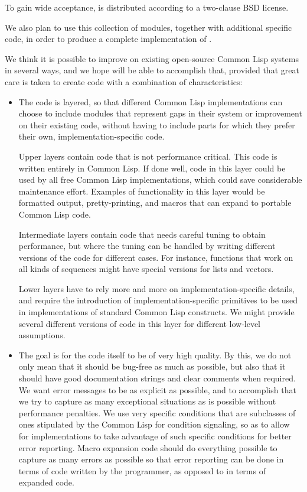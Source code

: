 To gain wide acceptance, \sysname{} is distributed according to a
two-clause BSD license.

We also plan to use this collection of modules, together with
additional specific code, in order to produce a complete
implementation of \commonlisp{}.

We think it is possible to improve on existing open-source Common Lisp
systems in several ways, and we hope \sysname{} will be able to
accomplish that, provided that great care is taken to create code with
a combination of characteristics:

\begin{itemize}
\item The code is layered, so that different Common Lisp
  implementations can choose to include \sysname{} modules that
  represent gaps in their system or improvement on their existing
  code, without having to include parts for which they prefer their
  own, implementation-specific code. 

  Upper layers contain code that is not performance critical.  This
  code is written entirely in Common Lisp.  If done well, code in this
  layer could be used by all free Common Lisp implementations, which
  could save considerable maintenance effort.  Examples of
  functionality in this layer would be formatted output,
  pretty-printing, and macros that can expand to portable Common Lisp
  code.

  Intermediate layers contain code that needs careful tuning to
  obtain performance, but where the tuning can be handled by writing
  different versions of the code for different cases.  For instance,
  functions that work on all kinds of sequences might have special
  versions for lists and vectors.

  Lower layers have to rely more and more on implementation-specific
  details, and require the introduction of implementation-specific
  primitives to be used in implementations of standard Common Lisp
  constructs.  We might provide several different versions of code in
  this layer for different low-level assumptions.

\item The goal is for the code itself to be of very high quality.
  By this, we do not only mean that it should be bug-free as much as
  possible, but also that it should have good documentation strings
  and clear comments when required.  We want error messages to be as
  explicit as possible, and to accomplish that we try to capture as
  many exceptional situations as is possible without performance
  penalties.  We use very specific conditions that are subclasses of
  ones stipulated by the Common Lisp \hs{} for condition
  signaling, so as to allow for implementations to take advantage of
  such specific conditions for better error reporting.  Macro
  expansion code should do everything possible to capture as many
  errors as possible so that error reporting can be done in terms of
  code written by the programmer, as opposed to in terms of expanded
  code.

\end{itemize}

